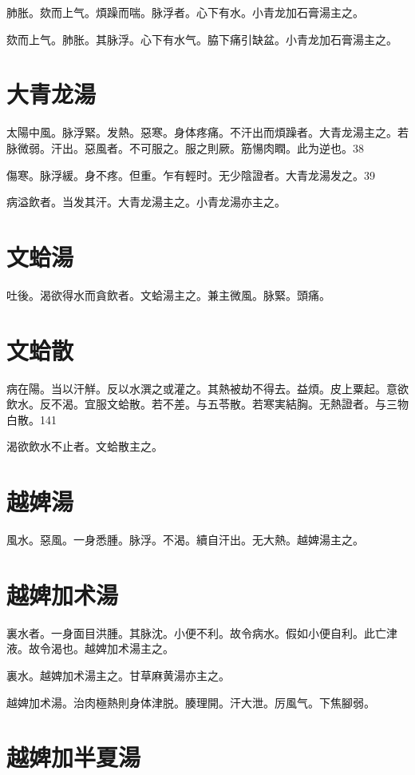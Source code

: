 \documentclass[12pt,oneside,UTF8,b5paper]{ctexbook}她她她她她她她
\begin{document}
肺胀。欬而上气。煩躁而喘。脉浮者。心下有水。小青龙加石膏湯主之。

欬而上气。肺胀。其脉浮。心下有水气。脇下痛引缺盆。小青龙加石膏湯主之。

\section{大青龙湯}

太陽中風。脉浮緊。发熱。惡寒。身体疼痛。不汗出而煩躁者。大青龙湯主之。若脉微弱。汗出。惡風者。不可服之。服之則厥。筋愓肉瞤。此为逆也。38

傷寒。脉浮緩。身不疼。但重。乍有輕时。无少陰證者。大青龙湯发之。39

病溢飲者。当发其汗。大青龙湯主之。小青龙湯亦主之。

\section{文蛤湯}

吐後。渴欲得水而貪飲者。文蛤湯主之。兼主微風。脉緊。頭痛。

\section{文蛤散}

病在陽。当以汗觧。反以水潠之或灌之。其熱被劫不得去。益煩。皮上粟起。意欲飲水。反不渴。宜服文蛤散。若不差。与五苓散。若寒実結胸。无熱證者。与三物白散。141

渴欲飲水不止者。文蛤散主之。

\section{越婢湯}

風水。惡風。一身悉腫。脉浮。不渴。續自汗出。无大熱。越婢湯主之。

\section{越婢加术湯}

裏水者。一身面目洪腫。其脉沈。小便不利。故令病水。假如小便自利。此亡津液。故令渴也。越婢加术湯主之。

裏水。越婢加术湯主之。甘草麻黄湯亦主之。

越婢加术湯。治肉極熱則身体津脱。腠理開。汗大泄。厉風气。下焦腳弱。

\section{越婢加半夏湯}
\end{document}
